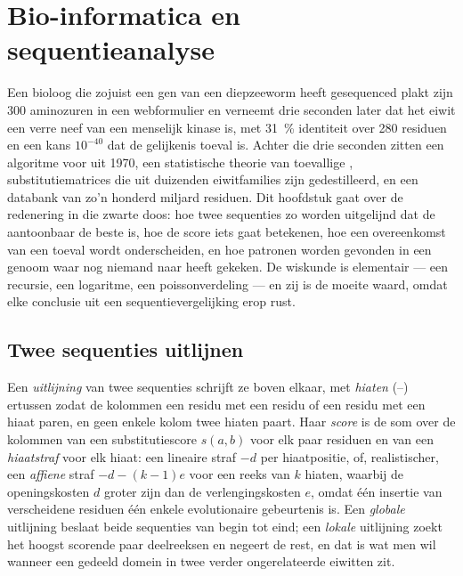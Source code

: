 \chapter{Bio-informatica en sequentieanalyse}\label{ch:b3:bioinformatics}

Een bioloog die zojuist een gen van een diepzeeworm heeft gesequenced
plakt zijn \num{300} aminozuren in een webformulier en verneemt drie
seconden later dat het eiwit een verre neef van een menselijk kinase
is, met \qty{31}{\%} identiteit over \num{280} residuen en een kans
$10^{-40}$ dat de gelijkenis toeval is. Achter die drie seconden zitten
een algoritme voor  uit 1970, een statistische
theorie van toevallige , substitutiematrices die uit
duizenden eiwitfamilies zijn gedestilleerd, en een databank van zo'n
honderd miljard residuen. Dit hoofdstuk gaat over de redenering in die
zwarte doos: hoe twee sequenties zo worden uitgelijnd dat de 
aantoonbaar de beste is, hoe de score iets gaat betekenen, hoe een
overeenkomst van een toeval wordt onderscheiden, en hoe patronen worden
gevonden in een genoom waar nog niemand naar heeft gekeken. De wiskunde
is elementair --- een recursie, een logaritme, een poissonverdeling ---
en zij is de moeite waard, omdat elke conclusie uit een
sequentievergelijking erop rust.

\section{Twee sequenties uitlijnen}

\begin{definition}\label{def:b3:bioinformatics:alignment}
Een \emph{uitlijning} van twee sequenties schrijft ze boven elkaar, met
\emph{hiaten} (--) ertussen zodat de kolommen een residu met een residu
of een residu met een hiaat paren, en geen enkele kolom twee hiaten
paart. Haar \emph{score} is de som over de kolommen van een
substitutiescore $s(a,b)$ voor elk paar residuen en van een
\emph{hiaatstraf} voor elk hiaat: een lineaire straf $-d$ per
hiaatpositie, of, realistischer, een \emph{affiene} straf
$-d - (k-1)e$ voor een reeks van $k$ hiaten, waarbij de openingskosten
$d$ groter zijn dan de verlengingskosten $e$, omdat één insertie van
verscheidene residuen één enkele evolutionaire gebeurtenis is. Een
\emph{globale} uitlijning beslaat beide sequenties van begin tot eind;
een \emph{lokale} uitlijning zoekt het hoogst scorende paar deelreeksen
en negeert de rest, en dat is wat men wil wanneer een gedeeld domein in
twee verder ongerelateerde eiwitten zit.
\end{definition}

